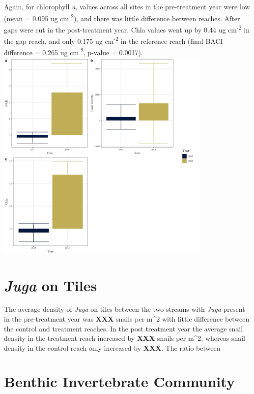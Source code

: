 \documentclass[double,12pt]{beavtex}
\begin{document}
  Again, for chlorophyll \emph{a}, values across all sites in the
  pre-treatment year were low (mean = 0.095 ug cm\textsuperscript{-2}),
  and there was little difference between reaches. After gaps were cut in
  the post-treatment year, Chla values went up by 0.44 ug
  cm\textsuperscript{-2} in the gap reach, and only 0.175 ug
  cm\textsuperscript{-2} in the reference reach (final BACI difference =
  0.265 ug cm\textsuperscript{-2}, p-value = 0.0017).
  \includegraphics[width=4.16667in]{Figures/Vars_Reach_Diffs.png}
  
  \section*{\texorpdfstring{\emph{Juga} on
  Tiles}{Juga on Tiles}}\label{juga-on-tiles}
  
  The average density of \emph{Juga} on tiles between the two streams with
  \emph{Juga} present in the pre-treatment year was \textbf{XXX} snails
  per m\^{}2 with little difference between the control and treatment
  reaches. In the post treatment year the average snail density in the
  treatment reach increased by \textbf{XXX} snails per m\^{}2, whereas
  snail density in the control reach only increased by \textbf{XXX}. The
  ratio between
  
  \section*{Benthic Invertebrate
  Community}\label{benthic-invertebrate-community}
  
\end{document}
